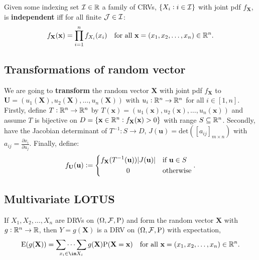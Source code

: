 \documentclass{article}
\begin{document}
\begingroup\belowdisplayskip=-10pt
\begin{definition}
    Given some indexing set $\mathcal{I}\in\mathbb{R}$ a family of CRVs, $\{X_i:i\in\mathcal{I}\}$ with joint pdf $f_\textbf{X}$, is \textbf{independent} iff for all finite $\mathcal{J}\in\mathcal{I}$: \[
        f_{\textbf{X}}(\textbf{x}) = \prod_{i=1}^nf_{X_i}(x_i) \quad \text{\textcolor{black}{for all }$\textbf{x}=(x_1,x_2,\ldots,x_n)\in\mathbb{R}^n$}
    \textcolor{black}{.}\]
\end{definition}
\endgroup

\subsection{Transformations of random vector}
\begin{definition}[Transformation]
    We are going to \textbf{transform} the random vector $\textbf{X}$ with joint pdf $f_\textbf{X}$ to $\textbf{U}=(u_1(\textbf{X}),u_2(\textbf{X}),\ldots,u_n(\textbf{X}))$ with $u_i: \mathbb{R}^n \rightarrow \mathbb{R}^n$ for all $i\in[1,n]$. Firstly, define $T:\mathbb{R}^n\rightarrow\mathbb{R}^n$ by $T(\textbf{x})=(u_1(\textbf{x}),u_2(\textbf{x}),\ldots,u_n(\textbf{x}))$ and assume $T$ is bijective on $D=\{\textbf{x}\in\mathbb{R}^n:f_\textbf{X}(\textbf{x})>0\}$ with range $S\subseteq\mathbb{R}^n$. Secondly, have the Jacobian determinant of $T^{-1}:S\rightarrow D$, $J(\textbf{u})=\text{det}([a_{ij}]_{m\times n})$ with $a_{ij}=\frac{\partial x_i}{\partial u_j}$. Finally, define: \[
        f_\textbf{U}(\textbf{u}) := \begin{dcases}
            f_\textbf{X}(T^{-1}(\textbf{u}))|J(\textbf{u})| & \text{\textcolor{black}{if }$\textbf{u}\in S$} \\
            \omit\hfil0\hfil & \text{\textcolor{black}{otherwise}}
        \end{dcases}\textcolor{black}{.}
    \]
\end{definition}
\subsection{Multivariate LOTUS}
\begingroup\belowdisplayskip=-10pt
\begin{theorem}
    If $X_1,X_2,\ldots,X_n$ are DRVs on $(\Omega,\mathcal{F},\mathrm{P})$ and form the random vector $\textbf{X}$ with $g:\mathbb{R}^n\rightarrow\mathbb{R}$, then $Y=g(\textbf{X})$ is a DRV on $(\Omega,\mathcal{F},\mathrm{P})$ with expectation, \[
    \E(g(\textbf{X}))=\mathop{\sum\dots\sum}_{x_i\in\im X_i}g(\textbf{X})\P(\textbf{X}=\textbf{x})
    \quad \text{\textcolor{black}{for all }$\textbf{x}=(x_1,x_2,\ldots,x_n)\in\RR^n$}
    \textcolor{black}{.}
    \]
\end{theorem}
\end{document}
